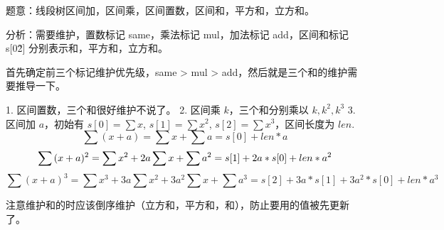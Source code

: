 题意：线段树区间加，区间乘，区间置数，区间和，平方和，立方和。

分析：需要维护，置数标记 same，乘法标记 mul，加法标记 add，区间和标记 s[0\~2] 分别表示和，平方和，立方和。

首先确定前三个标记维护优先级，same > mul > add，然后就是三个和的维护需要推导一下。

1. 区间置数，三个和很好维护不说了。
2. 区间乘 $k$，三个和分别乘以 $k,k^2,k^3$
3. 区间加 $a$，初始有 $s[0]=\sum{x}$, $s[1]=\sum{x^2}$, $s[2]=\sum{x^3}$，区间长度为 $len$.
    \begin {equation} 
    \sum{(x+a)}=\sum{x}+\sum{a}=s[0]+len*a
    \end {equation}
    \begin {equation} 
    \sum{(x+a)^2}=\sum{x^2}+2a\sum{x}+\sum{a^2}=s[1]+2a*s[0]+len*a^2 \\
    \end {equation}
    \begin {equation} 
    \sum{(x+a)^3}=\sum{x^3}+3a\sum{x^2}+3a^2\sum{x}+\sum{a^3}=s[2]+3a*s[1]+3a^2*s[0]+len*a^3 
    \end {equation}

    注意维护和的时应该倒序维护（立方和，平方和，和），防止要用的值被先更新了。